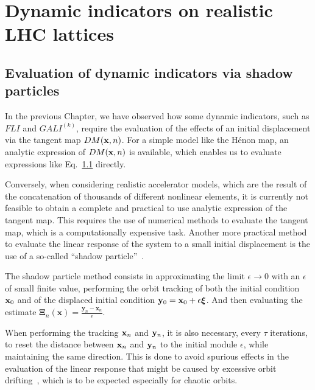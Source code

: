 \chapter{Dynamic indicators on realistic LHC lattices}

\section{Evaluation of dynamic indicators via shadow particles}

In the previous Chapter, we have observed how some dynamic indicators, such as $FLI$ and $GALI^{(k)}$, require the evaluation of the effects of an initial displacement via the tangent map $DM(\vb{x}, n)$. For a simple model like the Hénon map, an analytic expression of $DM(\vb{x}, n)$ is available, which enables us to evaluate expressions like Eq.~\ref{} directly.

Conversely, when considering realistic accelerator models, which are the result of the concatenation of thousands of different nonlinear elements, it is currently not feasible to obtain a complete and practical to use analytic expression of the tangent map. This requires the use of numerical methods to evaluate the tangent map, which is a computationally expensive task. Another more practical method to evaluate the linear response of the system to a small initial displacement is the use of a so-called ``shadow particle''~\cite{Skokos2010b}.

The shadow particle method consists in approximating the limit $\epsilon\to 0$ with an $\epsilon$ of small finite value, performing the orbit tracking of both the initial condition $\vb{x}_0$ and of the displaced initial condition $\vb{y}_0 = \vb{x}_0 + \epsilon \boldsymbol{\xi}$. And then evaluating the estimate $\boldsymbol{\Xi}_{n}(\mathbf{x})=\frac{\mathbf{y}_{n}-\mathbf{x}_{n}}{\epsilon}$.

When performing the tracking $\vb{x}_n$ and $\vb{y}_n$, it is also necessary, every $\tau$ iterations, to reset the distance between $\vb{x}_n$ and $\vb{y}_n$ to the initial module $\epsilon$, while maintaining the same direction. This is done to avoid spurious effects in the evaluation of the linear response that might be caused by excessive orbit drifting~\cite{eq2-2}, which is to be expected especially for chaotic orbits.

